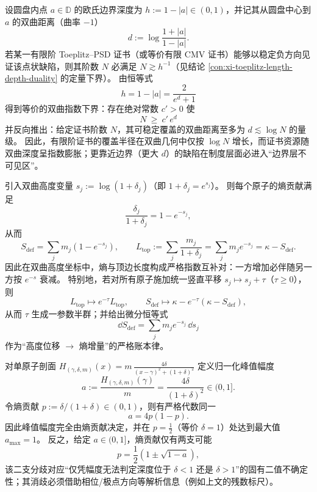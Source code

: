 \begin{proposition}
设圆盘内点 \(a\in\mathbb{D}\) 的欧氏边界深度为 \(h:=1-|a|\in(0,1)\)，并记其从圆盘中心到 \(a\) 的双曲距离（曲率 \(-1\)）
\[
d:=\log\frac{1+|a|}{1-|a|}.
\]
若某一有限阶 Toeplitz--PSD 证书（或等价有限 CMV 证书）能够以稳定负方向见证该点状缺陷，则其阶数 \(N\) 必满足 \(N\gtrsim h^{-1}\)（见结论 \ref{con:xi-toeplitz-length-depth-duality} 的定量下界）。
由恒等式
\[
h=1-|a|
=\frac{2}{e^{d}+1}
\]
得到等价的双曲指数下界：存在绝对常数 \(c'>0\) 使
\[
\boxed{\;
N\ \ge\ c'\,e^{d}\;}
\]
并反向推出：给定证书阶数 \(N\)，其可稳定覆盖的双曲距离至多为 \(d\lesssim \log N\) 的量级。
因此，有限阶证书的覆盖半径在双曲几何中仅按 \(\log N\) 增长，而证书资源随双曲深度呈指数膨胀；更靠近边界（更大 \(d\)）的缺陷在制度层面必进入“边界层不可见区”。
\end{proposition}

\begin{proposition}
引入双曲高度变量 \(s_j:=\log(1+\delta_j)\)（即 \(1+\delta_j=e^{s_j}\)）。
则每个原子的熵贡献满足
\[
\frac{\delta_j}{1+\delta_j}=1-e^{-s_j},
\]
从而
\[
S_{\mathrm{def}}=\sum_{j}m_j(1-e^{-s_j}),
\qquad
L_{\mathrm{top}}:=\sum_{j}\frac{m_j}{1+\delta_j}=\sum_{j}m_j e^{-s_j}
=\kappa-S_{\mathrm{def}}.
\]
因此在双曲高度坐标中，熵与顶边长度构成严格指数互补对：一方增加必伴随另一方按 \(e^{-s}\) 衰减。
特别地，若对所有原子施加统一竖直平移 \(s_j\mapsto s_j+\tau\)（\(\tau\ge0\)），则
\[
L_{\mathrm{top}}\longmapsto e^{-\tau}L_{\mathrm{top}},
\qquad
S_{\mathrm{def}}\longmapsto \kappa-e^{-\tau}(\kappa-S_{\mathrm{def}}),
\]
从而 \(\tau\) 生成一参数半群；并给出微分恒等式
\[
\boxed{\;
\dd S_{\mathrm{def}}=\sum_{j}m_j e^{-s_j}\,\dd s_j\;}
\]
作为“高度位移 \(\to\) 熵增量”的严格账本律。
\end{proposition}

\begin{proposition}
对单原子剖面
\(
H_{(\gamma,\delta,m)}(x)=m\,\frac{4\delta}{(x-\gamma)^2+(1+\delta)^2}
 \)
定义归一化峰值幅度
\[
a:=\frac{H_{(\gamma,\delta,m)}(\gamma)}{m}
=\frac{4\delta}{(1+\delta)^2}\in(0,1].
\]
令熵贡献 \(p:=\delta/(1+\delta)\in(0,1)\)，则有严格代数同一
\[
\boxed{\;a=4p(1-p).\;}
\]
因此峰值幅度完全由熵贡献决定，并在 \(p=\tfrac12\)（等价 \(\delta=1\)）处达到最大值 \(a_{\max}=1\)。
反之，给定 \(a\in(0,1]\)，熵贡献仅有两支可能
\[
p=\frac12\left(1\pm\sqrt{1-a}\right),
\]
该二支分歧对应“仅凭幅度无法判定深度位于 \(\delta<1\) 还是 \(\delta>1\)”的固有二值不确定性；其消歧必须借助相位/极点方向等解析信息（例如上文的残数标尺）。
\end{proposition}

